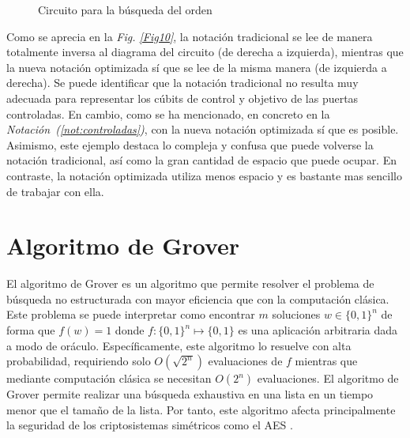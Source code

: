 \documentclass[10pt,conference,a4paper]{IEEEtran}
\begin{document}
\begin{figure}[htb!]
    \begin{center}
    \caption{Circuito para la búsqueda del orden}
    \label{fig:shor}
    \end{center}
\end{figure}

Como se aprecia en la \textit{Fig. \ref{Fig10}}, la notación tradicional se lee de manera totalmente inversa al diagrama del circuito (de derecha a izquierda), mientras que la nueva notación optimizada sí que se lee de la misma manera (de izquierda a derecha). Se puede identificar que la notación tradicional no resulta muy adecuada para representar los cúbits de control y objetivo de las puertas controladas. En cambio, como se ha mencionado, en concreto en la {\it Notación~(\ref{not:controladas})}, con la nueva notación optimizada sí que es posible. Asimismo, este ejemplo destaca lo compleja y confusa que puede volverse la notación tradicional, así como la gran cantidad de espacio que puede ocupar. En contraste, la notación optimizada utiliza menos espacio y es bastante mas sencillo de trabajar con ella.

\section{Algoritmo de Grover}
\label{seccion:4}
El algoritmo de Grover \cite{grover} es un algoritmo que permite resolver el problema de búsqueda no estructurada con mayor eficiencia que con la computación clásica. Este problema se puede interpretar como encontrar $m$ soluciones $w\in\{0,1\}^n$ de forma que $f(w)=1$ donde $f:\{0,1\}^n\mapsto\{0,1\}$ es una aplicación arbitraria dada a modo de oráculo. Específicamente, este algoritmo lo resuelve  con alta probabilidad, requiriendo solo $O(\sqrt{2^n})$ evaluaciones de $f$ mientras que mediante computación clásica se necesitan $O(2^n)$ evaluaciones. El algoritmo de Grover permite realizar una búsqueda exhaustiva en una lista en un tiempo menor que el tamaño de la lista. Por tanto, este algoritmo afecta principalmente la seguridad de los criptosistemas simétricos como  el AES \cite{grover_aes} \cite{groverattack}.
\end{document}
